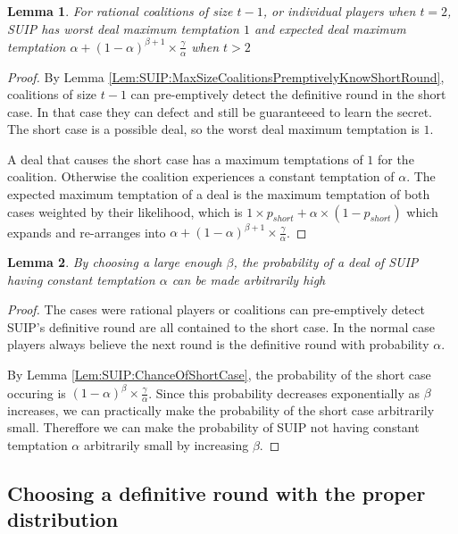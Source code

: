 \documentclass{dalcsthesis}
\newtheorem{lemma}{Lemma}
\begin{document}
\begin{lemma} For rational coalitions of size $t-1$, or individual players when $t=2$, SUIP has worst deal maximum temptation $1$ and expected deal maximum temptation $\alpha + (1-\alpha)^{\beta+1} \times \frac{\gamma}{\alpha}$ when $t > 2$ \label{Lem:SUIP:MaxSizeCoalitionsTemptedMore} \end{lemma}
\begin{proof}
By Lemma \ref{Lem:SUIP:MaxSizeCoalitionsPremptivelyKnowShortRound}, coalitions of size $t-1$ can pre-emptively detect the definitive round in the short case. In that case they can defect and still be guaranteeed to learn the secret. The short case is a possible deal, so the worst deal maximum temptation is $1$.

A deal that causes the short case has a maximum temptations of $1$ for the coalition. Otherwise the coalition experiences a constant temptation of $\alpha$. The expected maximum temptation of a deal is the maximum temptation of both cases weighted by their likelihood, which is $1 \times p_{short} + \alpha \times (1-p_{short})$ which expands and re-arranges into $\alpha + (1-\alpha)^{\beta+1} \times \frac{\gamma}{\alpha}$.
\end{proof}

\begin{lemma} By choosing a large enough $\beta$, the probability of a deal of SUIP having constant temptation $\alpha$ can be made arbitrarily high \label{Lem:SUIP:HighTemptationAvoidable} \end{lemma}
\begin{proof}
The cases were rational players or coalitions can pre-emptively detect SUIP's definitive round are all contained to the short case. In the normal case players always believe the next round is the definitive round with probability $\alpha$.

By Lemma \ref{Lem:SUIP:ChanceOfShortCase}, the probability of the short case occuring is $(1-\alpha)^\beta \times \frac{\gamma}{\alpha}$. Since this probability decreases exponentially as $\beta$ increases, we can practically make the probability of the short case arbitrarily small. Thereffore we can make the probability of SUIP not having constant temptation $\alpha$ arbitrarily small by increasing $\beta$.
\end{proof}

\subsection{Choosing a definitive round with the proper distribution}
\label{Sec:SUIP:ChooseRound}
\end{document}
